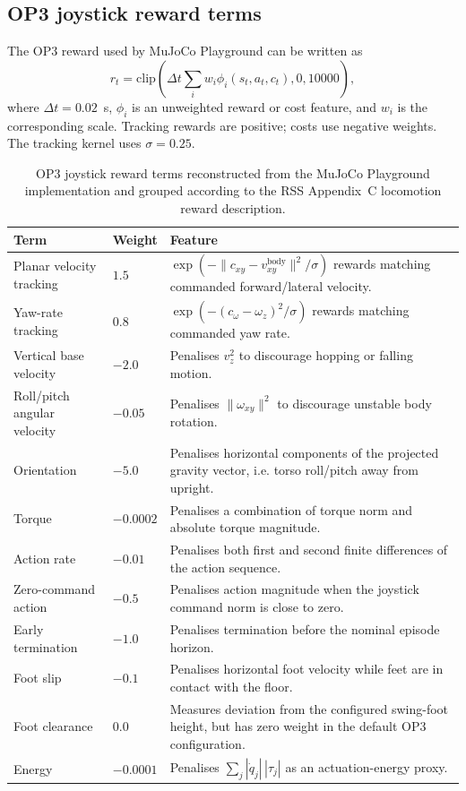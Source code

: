 \subsection{OP3 joystick reward terms}

The OP3 reward used by MuJoCo Playground can be written as
\[
r_t = \mathrm{clip}\left(\Delta t \sum_i w_i \phi_i(s_t,a_t,c_t), 0, 10000\right),
\]
where $\Delta t=0.02$~s, $\phi_i$ is an unweighted reward or cost feature, and $w_i$ is the corresponding scale. Tracking rewards are positive; costs use negative weights. The tracking kernel uses $\sigma=0.25$.

\begin{table}[t]
\centering
\small
\caption{OP3 joystick reward terms reconstructed from the MuJoCo Playground implementation and grouped according to the RSS Appendix~C locomotion reward description.}
\label{tab:op3-reward-terms}
\begin{tabularx}{\textwidth}{p{}p{}X}
\toprule
Term & Weight & Feature \\
\midrule
Planar velocity tracking & $1.5$ & $\exp(-\lVert c_{xy}-v^{\mathrm{body}}_{xy}\rVert^2/\sigma)$ rewards matching commanded forward/lateral velocity. \\
Yaw-rate tracking & $0.8$ & $\exp(-(c_\omega-\omega_z)^2/\sigma)$ rewards matching commanded yaw rate. \\
Vertical base velocity & $-2.0$ & Penalises $v_z^2$ to discourage hopping or falling motion. \\
Roll/pitch angular velocity & $-0.05$ & Penalises $\lVert\omega_{xy}\rVert^2$ to discourage unstable body rotation. \\
Orientation & $-5.0$ & Penalises horizontal components of the projected gravity vector, i.e. torso roll/pitch away from upright. \\
Torque & $-0.0002$ & Penalises a combination of torque norm and absolute torque magnitude. \\
Action rate & $-0.01$ & Penalises both first and second finite differences of the action sequence. \\
Zero-command action & $-0.5$ & Penalises action magnitude when the joystick command norm is close to zero. \\
Early termination & $-1.0$ & Penalises termination before the nominal episode horizon. \\
Foot slip & $-0.1$ & Penalises horizontal foot velocity while feet are in contact with the floor. \\
Foot clearance & $0.0$ & Measures deviation from the configured swing-foot height, but has zero weight in the default OP3 configuration. \\
Energy & $-0.0001$ & Penalises $\sum_j |\dot{q}_j|\,|\tau_j|$ as an actuation-energy proxy. \\
\bottomrule
\end{tabularx}
\end{table}


